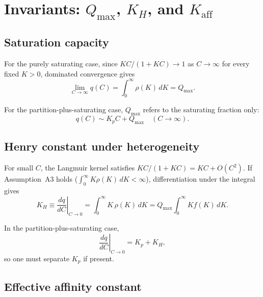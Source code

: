 \documentclass[12pt]{article}
\begin{document}
\section{Invariants: $Q_{\max}$, $K_H$, and $K_{\mathrm{aff}}$}

\subsection{Saturation capacity}

For the purely saturating case, since $KC/(1+KC)\to 1$ as
$C\to\infty$ for every fixed $K>0$, dominated convergence gives
\begin{equation}
  \lim_{C\to\infty} q(C)
  = \int_0^\infty \rho(K)\,dK = Q_{\max}.
  \label{eq:Qmax_limit}
\end{equation}

For the partition-plus-saturating case, $Q_{\max}$ refers to the
saturating fraction only:
\begin{equation}
  q(C) \sim K_p C + Q_{\max}
  \quad (C\to\infty).
\end{equation}

\subsection{Henry constant under heterogeneity}

For small $C$, the Langmuir kernel satisfies
$KC/(1+KC) = KC + O(C^2)$.
If Assumption~A3 holds ($\int_0^\infty K\rho(K)\,dK<\infty$),
differentiation under the integral gives~\cite{Jaroniec1988,Rudzinski1992}
\begin{equation}
  K_H \equiv \left.\frac{dq}{dC}\right|_{C\to 0}
  = \int_0^\infty K\,\rho(K)\,dK
  = Q_{\max}\int_0^\infty K f(K)\,dK.
  \label{eq:KH_moment}
\end{equation}

In the partition-plus-saturating case,
\begin{equation}
  \left.\frac{dq}{dC}\right|_{C\to 0} = K_p + K_H,
  \label{eq:KH_total_partition}
\end{equation}
so one must separate $K_p$ if present.

\subsection{Effective affinity constant}
\label{sec:Kaff}
\end{document}
